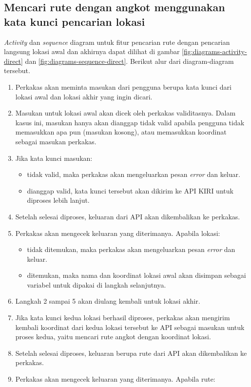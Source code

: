\subsection{Mencari rute dengan angkot menggunakan kata kunci pencarian lokasi}
\label{sec:design-flow-direct}

\textit{Activity} dan \textit{sequence} diagram untuk fitur pencarian rute dengan pencarian langsung lokasi awal dan akhirnya dapat dilihat di gambar \ref{fig:diagrams-activity-direct} dan \ref{fig:diagrams-sequence-direct}. Berikut alur dari diagram-diagram tersebut.

\begin{enumerate}
	\item Perkakas akan meminta masukan dari pengguna berupa kata kunci dari lokasi awal dan lokasi akhir yang ingin dicari.
	\item Masukan untuk lokasi awal akan dicek oleh perkakas validitasnya. Dalam kasus ini, masukan hanya akan dianggap tidak valid apabila pengguna tidak memasukkan apa pun (masukan kosong), atau memasukkan koordinat \latlon sebagai masukan perkakas.
	\item Jika kata kunci masukan:
	
	\begin{itemize}
		\item tidak valid, maka perkakas akan mengeluarkan pesan \textit{error} dan keluar.
		\item dianggap valid, kata kunci tersebut akan dikirim ke API KIRI untuk diproses lebih lanjut.
	\end{itemize}
	 
	\item Setelah selesai diproses, keluaran dari API akan dikembalikan ke perkakas.
	\item Perkakas akan mengecek keluaran yang diterimanya. Apabila lokasi:
	
	\begin{itemize}
		\item tidak ditemukan, maka perkakas akan mengeluarkan pesan \textit{error} dan keluar.
		\item ditemukan, maka nama dan koordinat \latlon lokasi awal akan disimpan sebagai variabel untuk dipakai di langkah selanjutnya.
	\end{itemize}
	
	\item Langkah 2 sampai 5 akan diulang kembali untuk lokasi akhir.
	\item Jika kata kunci kedua lokasi berhasil diproses, perkakas akan mengirim kembali koordinat \latlon dari kedua lokasi tersebut ke API sebagai masukan untuk proses kedua, yaitu mencari rute angkot dengan koordinat \latlon lokasi.
	\item Setelah selesai diproses, keluaran berupa rute dari API akan dikembalikan ke perkakas.
	\item Perkakas akan mengecek keluaran yang diterimanya. Apabila rute:
	

\end{enumerate}
